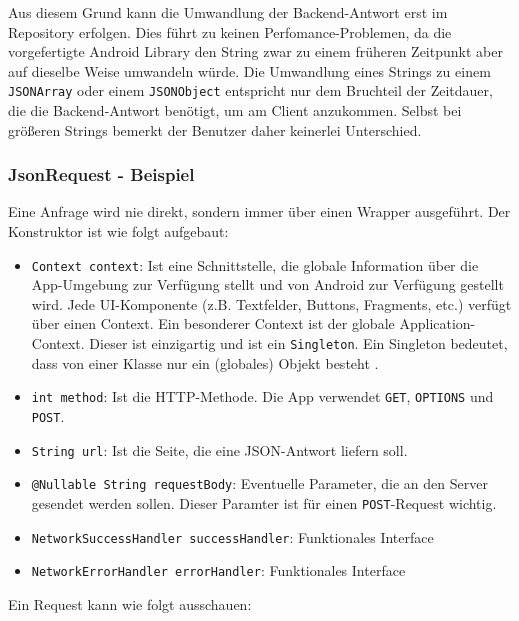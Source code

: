 Aus diesem Grund kann die Umwandlung der Backend-Antwort erst im
Repository erfolgen. Dies führt zu keinen Perfomance-Problemen, da die
vorgefertigte Android Library den String zwar zu einem früheren
Zeitpunkt aber auf dieselbe Weise umwandeln würde. Die Umwandlung eines
Strings zu einem \texttt{JSONArray} oder einem \texttt{JSONObject}
entspricht nur dem Bruchteil der Zeitdauer, die die Backend-Antwort
benötigt, um am Client anzukommen. Selbst bei größeren Strings bemerkt
der Benutzer daher keinerlei Unterschied.

\hypertarget{jsonrequest---beispiel}{%
\subsubsection{JsonRequest - Beispiel}\label{jsonrequest---beispiel}}

Eine Anfrage wird nie direkt, sondern immer über einen Wrapper
ausgeführt. Der Konstruktor ist wie folgt aufgebaut:

\begin{itemize}
\tightlist
\item
  \texttt{Context\ context}: Ist eine Schnittstelle, die globale
  Information über die App-Umgebung zur Verfügung stellt \cite{context}
  und von Android zur Verfügung gestellt wird. Jede UI-Komponente (z.B.
  Textfelder, Buttons, Fragments, etc.) verfügt über einen Context. Ein
  besonderer Context ist der globale Application-Context. Dieser ist
  einzigartig und ist ein \texttt{Singleton}. Ein Singleton bedeutet,
  dass von einer Klasse nur ein (globales) Objekt besteht
  \cite{singleton}.
\item
  \texttt{int\ method}: Ist die HTTP-Methode. Die App verwendet
  \texttt{GET}, \texttt{OPTIONS} und \texttt{POST}.
\item
  \texttt{String\ url}: Ist die Seite, die eine JSON-Antwort liefern
  soll.
\item
  \texttt{@Nullable\ String\ requestBody}: Eventuelle Parameter, die an
  den Server gesendet werden sollen. Dieser Paramter ist für einen
  \texttt{POST}-Request wichtig.
\item
  \texttt{NetworkSuccessHandler\ successHandler}: Funktionales Interface
\item
  \texttt{NetworkErrorHandler\ errorHandler}: Funktionales Interface
\end{itemize}

Ein Request kann wie folgt ausschauen:

